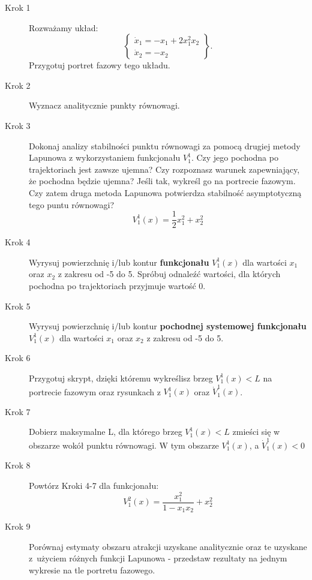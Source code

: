 \documentclass{sprawozdanie-agh}
\begin{document}
        \begin{description}

            \item[Krok 1]         Rozważamy układ:
            \begin{equation}
                \left\{
                \begin{array}{l}
                    \dot{x}_{1} = -x_{1} + 2x_{1}^{2}x_{2}\\
                    \dot{x}_{2} = -x_{2}
                \end{array}
                \right\}.
            \end{equation} Przygotuj portret fazowy tego układu.

            \item[Krok 2] Wyznacz analitycznie punkty równowagi.

            \item[Krok 3] Dokonaj analizy stabilności punktu równowagi za pomocą drugiej metody Lapunowa z wykorzystaniem funkcjonału $V_{1}^{1}$. Czy jego pochodna po trajektoriach jest zawsze ujemna? Czy rozpoznasz warunek zapewniający, że pochodna będzie ujemna? Jeśli tak, wykreśl go  na portrecie fazowym. Czy zatem druga metoda Lapunowa potwierdza stabilność asymptotyczną tego puntu równowagi?
            \begin{equation*}
                V_{1}^{1}(x) = \frac{1}{2}x_{1}^{2} + x_{2}^{2}
            \end{equation*}

            \item[Krok 4] Wyrysuj powierzchnię i/lub kontur \textbf{funkcjonału} $V_{1}^{1}(x)$ dla wartości $x_1$ oraz $x_2$ z zakresu od -5 do 5. Spróbuj odnaleźć wartości, dla których pochodna po trajektoriach przyjmuje wartość 0.
            \item[Krok 5] Wyrysuj powierzchnię i/lub kontur \textbf{pochodnej systemowej funkcjonału} $V_{1}^{1}(x)$ dla wartości $x_1$ oraz $x_2$ z zakresu od -5 do 5.
            \item[Krok 6] Przygotuj skrypt, dzięki któremu wykreślisz brzeg $V_{1}^{1}(x) < L$ na portrecie fazowym oraz rysunkach z $V_{1}^{1}(x)$ oraz $\dot{V}_{1}^{1}(x)$.
            \item[Krok 7] Dobierz maksymalne L, dla którego brzeg $V_1^{1}(x) < L$ zmieści się w obszarze wokół punktu równowagi. W tym obszarze $V_{1}^{1}(x)$, a $\dot{V}_1^{1}(x)<0$
            \item[Krok 8] Powtórz Kroki 4-7 dla funkcjonału:
            \begin{equation*}
                V_{1}^{2}(x) = \frac{x_{1}^{2}}{1 - x_{1}x_{2}} + x_{2}^{2}
            \end{equation*}
            \item[Krok 9] Porównaj estymaty obszaru atrakcji uzyskane analitycznie oraz te uzyskane z~użyciem różnych funkcji Lapunowa - przedstaw rezultaty na jednym wykresie na tle portretu fazowego.
        \end{description}
\end{document}
